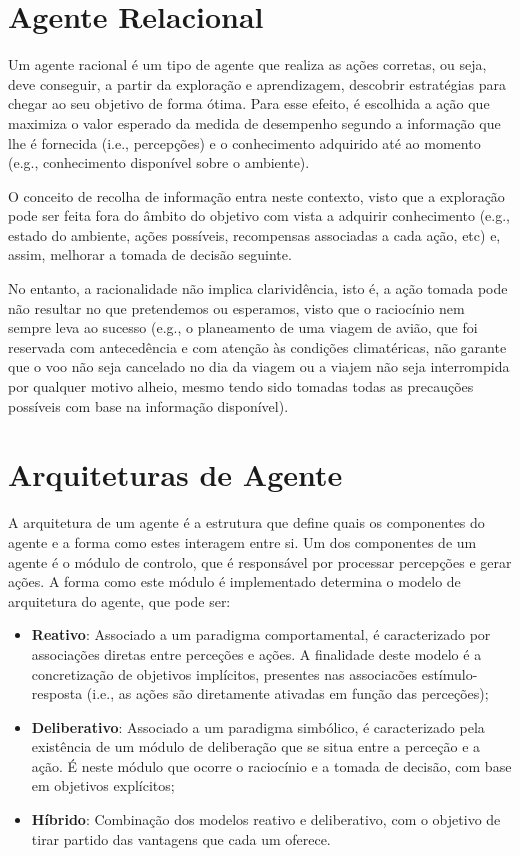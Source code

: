\section{Agente Relacional}\label{sec:agente-relacional}

Um agente racional é um tipo de agente que realiza as ações corretas, ou seja, deve conseguir, a partir da exploração e aprendizagem, descobrir estratégias para chegar ao seu objetivo de forma ótima.
Para esse efeito, é escolhida a ação que maximiza o valor esperado da medida de desempenho segundo a informação que lhe é fornecida (i.e., percepções) e o conhecimento adquirido até ao momento (e.g., conhecimento disponível sobre o ambiente).

O conceito de recolha de informação entra neste contexto, visto que a exploração pode ser feita fora do âmbito do objetivo com vista a adquirir conhecimento (e.g., estado do ambiente, ações possíveis, recompensas associadas a cada ação, etc) e, assim, melhorar a tomada de decisão seguinte.

No entanto, a racionalidade não implica clarividência, isto é, a ação tomada pode não resultar no que pretendemos ou esperamos, visto que o raciocínio nem sempre leva ao sucesso (e.g., o planeamento de uma viagem de avião, que foi reservada com antecedência e com atenção às condições climatéricas, não garante que o voo não seja cancelado no dia da viagem ou a viajem não seja interrompida por qualquer motivo alheio, mesmo tendo sido tomadas todas as precauções possíveis com base na informação disponível).


\section{Arquiteturas de Agente}\label{sec:arquiteturas-agente}

A arquitetura de um agente é a estrutura que define quais os componentes do agente e a forma como estes interagem entre si.
Um dos componentes de um agente é o módulo de controlo, que é responsável por processar percepções e gerar ações.
A forma como este módulo é implementado determina o modelo de arquitetura do agente, que pode ser:

\begin{itemize}
    \item \textbf{Reativo}: Associado a um paradigma comportamental, é caracterizado por associações diretas entre perceções e ações.
    A finalidade deste modelo é a concretização de objetivos implícitos, presentes nas associacões estímulo-resposta (i.e., as ações são diretamente ativadas em função das perceções);
    \item \textbf{Deliberativo}: Associado a um paradigma simbólico, é caracterizado pela existência de um módulo de deliberação que se situa entre a perceção e a ação.
    É neste módulo que ocorre o raciocínio e a tomada de decisão, com base em objetivos explícitos;
    \item \textbf{Híbrido}: Combinação dos modelos reativo e deliberativo, com o objetivo de tirar partido das vantagens que cada um oferece.
\end{itemize}
